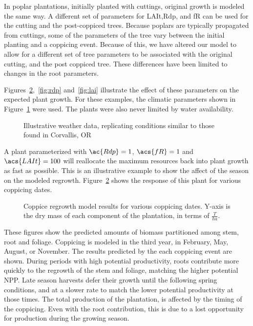 \documentclass[10pt]{article}
\begin{document}
In poplar plantations, initially planted with cuttings, original
growth is modeled the same way.  A different set of parameters for
\ac{LAIt},\ac{Rdp}, and \acs{fR} can be used for the cutting and the
post-coppiced trees.  Because poplars are typically propagated from
cuttings, some of the parameters of the tree vary between the initial
planting and a coppicing event.  Because of this, we have altered our
model to allow for a different set of tree parameters to be associated
with the original cutting, and the post coppiced tree.  These
differences have been limited to changes in the root parameters.

Figures~\ref{fig:date},~\ref{fig:rdp} and~\ref{fig:lai} illustrate the
effect of these parameters on the expected plant growth.  For these
examples, the climatic parameters shown in
Figure~\ref{fig:weather} were used.  The plants were also never
limited by water availability.

\begin{figure}
  \centering
%  
  \caption{Illustrative weather data, replicating conditions similar
    to those found in Corvallis, OR}
  \label{fig:weather}
\end{figure}

A plant parameterized with $\ac{Rdp}=1$, $\acs{fR}=1$ and
$\acs{LAIt}=100$ will reallocate the maximum resources back into plant
growth as fast as possible.  This is an illustrative example to show
the affect of the season on the modeled regrowth.
Figure~\ref{fig:date} shows the response of this plant for various
coppicing dates.

\begin{figure}
  \centering
  
  \caption{Coppice regrowth model results for various coppicing dates.
    Y-axis is the dry mass of each component of the plantation, in
    terms of $\frac{T}{ha}$.}
  \label{fig:date}
\end{figure}

These figures show the predicted amounts of biomass partitioned among
stem, root and foliage.  Coppicing is modeled in the third year, in
February, May, August, or November.  The results predicted by the each
coppicing event are shown.  During periods with high potential
productivity, roots contribute more quickly to the regrowth of the
stem and foliage, matching the higher potential \ac{NPP}.  Late season
harvests defer their growth until the following spring conditions, and
at a slower rate to match the lower potential productivity at those
times.  The total production of the plantation, is affected by the
timing of the coppicing.  Even with the root contribution, this is due
to a lost opportunity for production during the growing season.
\end{document}
